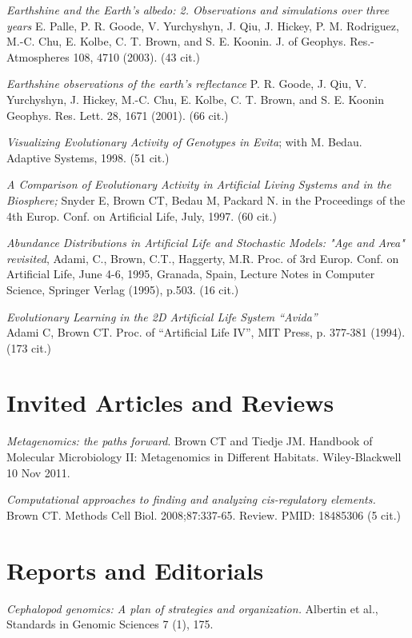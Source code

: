 \documentclass[margin,line]{resume}
\begin{document}
\begin{resume}
{\em Earthshine and the Earth's albedo: 2. Observations and simulations over three years}
 E. Palle, P. R. Goode, V. Yurchyshyn, J. Qiu, J. Hickey, P. M. Rodriguez, M.-C. Chu, E. Kolbe, C. T. Brown, and S. E. Koonin.
J. of Geophys. Res.-Atmospheres 108, 4710 (2003). (43 cit.)

{\em Earthshine observations of the earth's reflectance}
P. R. Goode, J. Qiu, V. Yurchyshyn, J. Hickey, M.-C. Chu, E. Kolbe, C. T. Brown, and S. E. Koonin
Geophys. Res. Lett. 28, 1671 (2001). (66 cit.)

{\em Visualizing Evolutionary Activity of Genotypes in Evita};
with M. Bedau.  Adaptive Systems, 1998. (51 cit.)

{\em A Comparison of Evolutionary Activity in Artificial Living Systems and in the 
	Biosphere;} Snyder E, Brown CT, Bedau M, Packard N.
in the Proceedings of the 4th Europ. Conf. on 
Artificial Life, July, 1997.  (60 cit.)

\newpage

{\em Abundance Distributions in Artificial Life and Stochastic Models: "Age and
Area" revisited}, Adami, C., Brown, C.T., Haggerty, M.R.
Proc. of 3rd Europ. Conf. on Artificial Life, June 4-6, 1995,
Granada, Spain, Lecture Notes in Computer Science, Springer Verlag (1995),
p.503. (16 cit.)

{\em Evolutionary Learning in the 2D Artificial Life System ``Avida''}\\
Adami C, Brown CT. Proc. of ``Artificial Life IV'', MIT Press, p. 377-381
(1994).  (173 cit.)

\section{\mysidestyle Invited Articles and Reviews}

{\em Metagenomics: the paths forward}.  Brown CT and Tiedje JM.
Handbook of Molecular Microbiology II: Metagenomics in Different
Habitats.  Wiley-Blackwell 10 Nov 2011.

{\em Computational approaches to finding and analyzing cis-regulatory elements.} 
Brown CT. Methods Cell Biol. 2008;87:337-65. Review.
PMID: 18485306  (5 cit.)

\section{\mysidestyle Reports and Editorials}

{\em Cephalopod genomics: A plan of strategies and organization.} Albertin et al., Standards in Genomic Sciences 7 (1), 175.


\end{resume}
\end{document}
